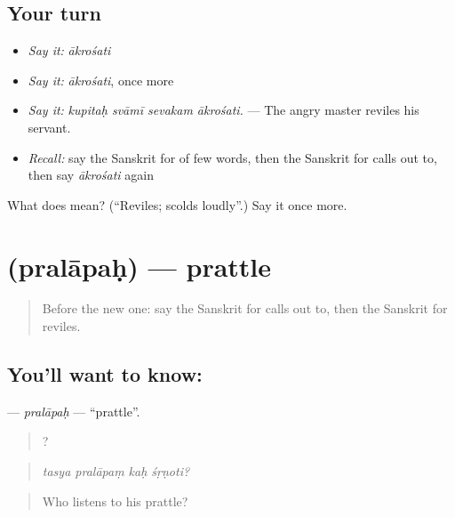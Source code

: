 \subsection*{Your turn}
\begin{itemize}
\raggedright
  \item \emph{Say it:} \emph{ākrośati}
  \item \emph{Say it:} \emph{ākrośati}, once more
  \item \emph{Say it:} \emph{kupitaḥ svāmī sevakam ākrośati.} — The angry master reviles his servant.
  \item \emph{Recall:} say the Sanskrit for of few words, then the Sanskrit for calls out to, then say \emph{ākrośati} again
\end{itemize}

\begin{tcolorbox}[breakable,colback=teal!4,colframe=teal!35!black,title={Before you move on}]
What does  mean? (\textquotedblleft{}Reviles; scolds loudly\textquotedblright{}.) Say it once more.
\end{tcolorbox}
\section[\texorpdfstring{\sk{प्रलापः} (pralāpaḥ)}{प्रलापः (pralāpaḥ)}]{ (pralāpaḥ) — prattle}

\label{lesson:SA-C464-pralapah}



\begin{quote}
Before the new one: say the Sanskrit for calls out to, then the Sanskrit for reviles.
\end{quote}

\subsection*{You'll want to know: }
\textbf{} — \emph{pralāpaḥ} — \textquotedblleft{}prattle\textquotedblright{}.

\begin{quote}
   ?
\end{quote}

\begin{quote}
\emph{tasya pralāpaṃ kaḥ śṛṇoti?}
\end{quote}

\begin{quote}
Who listens to his prattle?
\end{quote}

